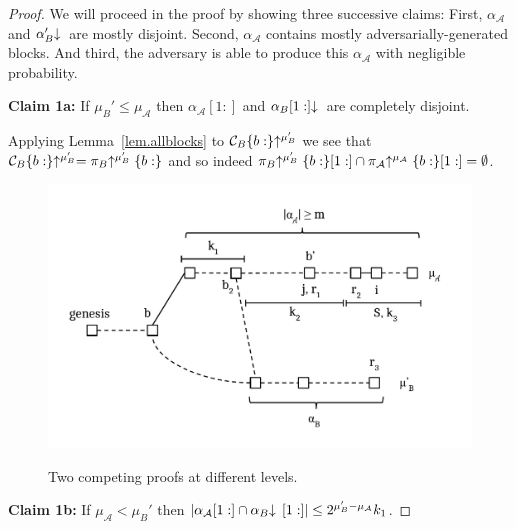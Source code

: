 \begin{proof}
%

    We will proceed in the proof by showing three successive claims: First,
    $\alpha_\mathcal{A}$ and $\alpha'_B\negthickspace\downarrow\,$ are mostly
    disjoint. Second, $\alpha_\mathcal{A}$ contains mostly
    adversarially-generated blocks. And third, the adversary is able to produce
    this $\alpha_\mathcal{A}$ with negligible probability.

    \textbf{Claim 1a: } If $\mu_B' \leq \mu_\mathcal{A}$ then
    $\alpha_\mathcal{A}[1:]$ and $\alpha_B[1:]\negthickspace\downarrow\,$ are completely
    disjoint. 

    Applying Lemma~\ref{lem.allblocks}
    to $\mathcal{C}_B\{b:\}\negthickspace\uparrow^{\mu_B'}$ we see that
    $\mathcal{C}_B\{b:\}\negthickspace\uparrow^{\mu_B'} = \pi_B\negthickspace\uparrow^{\mu_B'}\{b:\}$ and so
    indeed
    $\pi_B\negthickspace\uparrow^{\mu_B'}\{b:\}[1:] \cap
    \pi_\mathcal{A}\negthickspace\uparrow^{\mu_\mathcal{A}}\{b:\}[1:] = \emptyset$.

    \begin{figure}
        \caption{Two competing proofs at different levels.}
        \centering
        \includegraphics[width=\columnwidth,keepaspectratio]{figures/security-proof-chain.pdf}
        \label{fig.sec-comparison}
    \end{figure}

    \textbf{Claim 1b: } If $\mu_\mathcal{A} < \mu_B'$ then
    $|\alpha_\mathcal{A}[1:] \cap \alpha_B\negthickspace\downarrow\,[1:]| \leq 2^{\mu_B' - \mu_\mathcal{A}} k_1$.


\end{proof}
